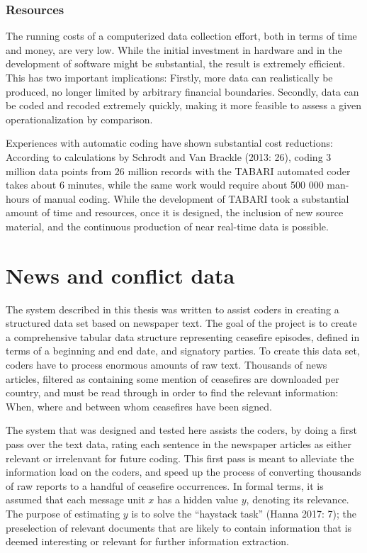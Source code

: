 \documentclass[12pt,twoside]{reedthesis}
\begin{document}
\subsection{Resources}\label{resources}

The running costs of a computerized data collection effort, both in
terms of time and money, are very low. While the initial investment in
hardware and in the development of software might be substantial, the
result is extremely efficient. This has two important implications:
Firstly, more data can realistically be produced, no longer limited by
arbitrary financial boundaries. Secondly, data can be coded and recoded
extremely quickly, making it more feasible to assess a given
operationalization by comparison.

Experiences with automatic coding have shown substantial cost
reductions: According to calculations by Schrodt and Van Brackle (2013:
26), coding 3 million data points from 26 million records with the
TABARI automated coder takes about 6 minutes, while the same work would
require about 500 000 man-hours of manual coding. While the development
of TABARI took a substantial amount of time and resources, once it is
designed, the inclusion of new source material, and the continuous
production of near real-time data is possible.

\chapter{News and conflict data}\label{news-and-conflict-data}

The system described in this thesis was written to assist coders in
creating a structured data set based on newspaper text. The goal of the
project is to create a comprehensive tabular data structure representing
ceasefire episodes, defined in terms of a beginning and end date, and
signatory parties. To create this data set, coders have to process
enormous amounts of raw text. Thousands of news articles, filtered as
containing some mention of ceasefires are downloaded per country, and
must be read through in order to find the relevant information: When,
where and between whom ceasefires have been signed.

The system that was designed and tested here assists the coders, by
doing a first pass over the text data, rating each sentence in the
newspaper articles as either relevant or irrelenvant for future coding.
This first pass is meant to alleviate the information load on the
coders, and speed up the process of converting thousands of raw reports
to a handful of ceasefire occurrences. In formal terms, it is assumed
that each message unit \(x\) has a hidden value \(y\), denoting its
relevance. The purpose of estimating \(y\) is to solve the ``haystack
task'' (Hanna 2017: 7); the preselection of relevant documents that are
likely to contain information that is deemed interesting or relevant for
further information extraction.
\end{document}
